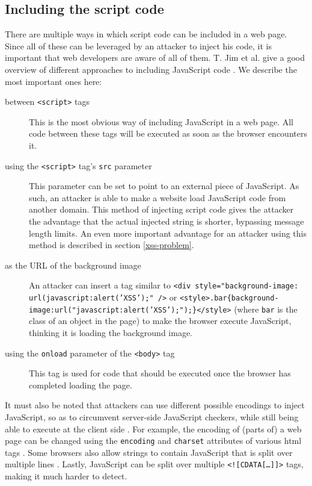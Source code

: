 \subsection{Including the script code}\label{injecting-script}
There are multiple ways in which script code can be included in a web page. Since all of these can be leveraged by an attacker to inject his code, it is important that web developers are aware of all of them. T. Jim et al. give a good overview of different approaches to including JavaScript code \cite{Jim2007}. We describe the most important ones here:
\begin{description}
	\item[between \texttt{<script>} tags] This is the most obvious way of including JavaScript in a web page. All code between these tags will be executed as soon as the browser encounters it.
	\item[using the \texttt{<script>} tag's \texttt{src} parameter] This parameter can be set to point to an external piece of JavaScript. As such, an attacker is able to make a website load JavaScript code from another domain. This method of injecting script code gives the attacker the advantage that the actual injected string is shorter, bypassing message length limits. An even more important advantage for an attacker using this method is described in section \ref{xss-problem}.
	\item[as the URL of the background image] An attacker can insert a tag similar to \texttt{<div style="background-image: url(javascript:alert('XSS');" />} or \texttt{<style>.bar\{background-image:url("javascript:alert('XSS');");\}</style>} (where \texttt{bar} is the class of an object in the page) to make the browser execute JavaScript, thinking it is loading the background image.
	\item[using the \texttt{onload} parameter of the \texttt{<body>} tag] This tag is used for code that should be executed once the browser has completed loading the page.
\end{description}

It must also be noted that attackers can use different possible encodings to inject JavaScript, so as to circumvent server-side JavaScript checkers, while still being able to execute at the client side \cite{Jim2007}. For example, the encoding of (parts of) a web page can be changed using the \texttt{encoding} and \texttt{charset} attributes of various \gls{html} tags \cite{Ishida2010}. Some browsers also allow strings to contain JavaScript that is split over multiple lines \cite{Jim2007}. Lastly, JavaScript can be split over multiple  \texttt{<![CDATA[\dots]]>} tags, making it much harder to detect.


